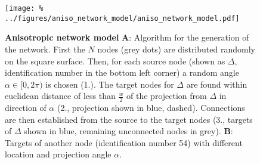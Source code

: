 
\begin{figure}[h]
  \vspace{0.25cm}
  \centering
  \texttt{[image: \%
    ../figures/aniso\_network\_model/aniso\_network\_model.pdf]} %
  \vspace{0.1cm}
\caption{{\bf Anisotropic network model} \textbf{A}: Algorithm for the
  generation of the network. First the $N$ nodes (grey dots) are
  distributed randomly on the square surface. Then, for each source
  node (shown as $\Delta$, identification number in the bottom left
  corner) a random angle $\alpha \in [0,2\pi)$ is chosen (1.). The
  target nodes for $\Delta$ are found within euclidean distance of
  less than $\frac{w}{2}$ of the projection from $\Delta$ in
  direction of $\alpha$ (2., projection shown in blue,
  dashed). Connections are then established from the source to the
  target nodes (3., targets of $\Delta$ shown in blue, remaining
  unconnected nodes in grey). \textbf{B}: Targets of another node
  (identification number 54) with different location and projection
  angle $\alpha$.}
\label{fig:aniso_netd}
\end{figure}
